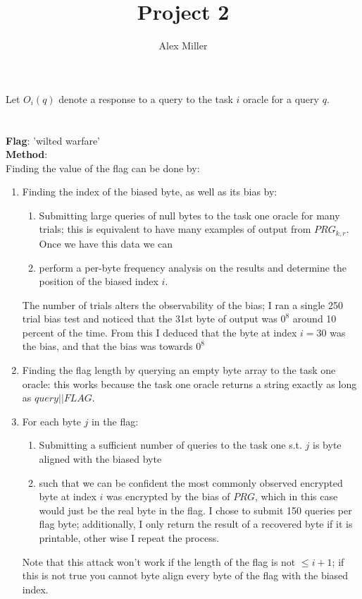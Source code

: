 \documentclass[]{article}
\title{Project 2}
\author{Alex Miller}
\begin{document}
\maketitle

Let $O_i(q)$ denote a response to a query to the task $i$ oracle for a query $q$.

\section{}
\textbf{Flag}: 'wilted warfare'
\\
\textbf{Method}:
\\
Finding the value of the flag can be done by:
\begin{enumerate}
	\item Finding the index of the biased byte, as well as its bias by:
	\begin{enumerate}
		\item Submitting large queries of null bytes to the task one oracle for many trials; this is equivalent to have many examples of output from $PRG_{k,r}$. Once we have this data we can
		\item perform a per-byte frequency analysis on the results and determine the position of the biased index $i$.
	\end{enumerate}
	The number of trials alters the observability of the bias; I ran a single 250 trial bias test and noticed that the 31st byte of output was $0^8$ around 10 percent of the time. From this I deduced that the byte at index $i = 30$ was the bias, and that the bias was towards $0^8$
	\item Finding the flag length by querying an empty byte array to the task one oracle: this works because the task one oracle returns a string exactly as long as $query || FLAG$.
	\item For each byte $j$ in the flag:
	\begin{enumerate}
		\item Submitting a sufficient number of queries to the task one s.t. $j$ is byte aligned with the biased byte
		\item such that we can be confident the most commonly observed encrypted byte at index $i$ was encrypted by the bias of $PRG$, which in this case would just be the real byte in the flag. I chose to submit 150 queries per flag byte; additionally, I only return the result of a recovered byte if it is printable, other wise I repeat the process.
	\end{enumerate}
	Note that this attack won't work if the length of the flag is not $\leq i + 1$; if this is not true you cannot byte align every byte of the flag with the biased index.
\end{enumerate}
\end{document}
